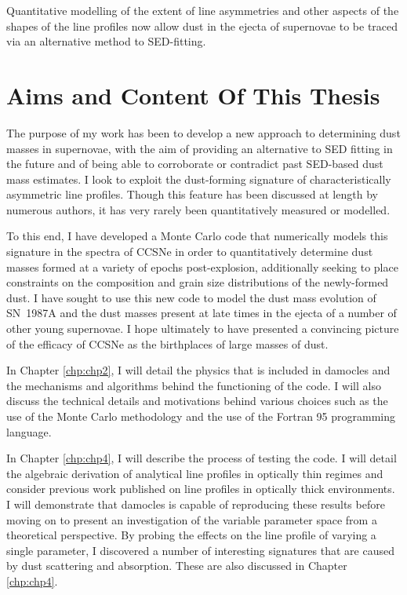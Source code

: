 Quantitative modelling of the extent of line asymmetries and other aspects of the shapes of the line profiles now allow dust in the ejecta of supernovae to be traced via an alternative method to SED-fitting.  

\section{Aims and Content Of This Thesis}
The purpose of my work has been to develop a new approach to determining dust masses in supernovae, with the aim of providing an alternative to SED fitting in the future and of being able to corroborate or contradict past SED-based dust mass estimates.  I look to exploit the dust-forming signature of characteristically asymmetric line profiles.  Though this feature has been discussed at length by numerous authors, it has very rarely been quantitatively measured or modelled.

To this end, I have developed a Monte Carlo  code that numerically models this signature in the spectra of CCSNe in order to quantitatively determine dust masses formed at a variety of epochs post-explosion, additionally seeking to place constraints on the composition and grain size distributions of the newly-formed dust. I have sought to use this new code to model the dust mass evolution  of SN~1987A and the dust masses present at late times in the ejecta of a number of other young supernovae.  I hope ultimately to have presented a convincing picture of the efficacy of CCSNe as the birthplaces of large masses of dust.

In Chapter \ref{chp:chp2}, I will detail the physics that is included in {\sc damocles} and the mechanisms and algorithms behind the functioning of the code.  I will also discuss the technical details and motivations behind various choices such as the use of the Monte Carlo methodology and the use of the Fortran 95 programming language.  

In Chapter \ref{chp:chp4}, I will describe the process of testing the code.  I will detail the algebraic derivation of analytical line profiles in optically thin regimes and consider previous work published on line profiles in optically thick environments.  I will demonstrate that {\sc damocles} is capable of reproducing these results before moving on to present an investigation of the variable parameter space from a theoretical perspective.  By probing the effects on the line profile of varying a single parameter, I discovered a number of interesting signatures that are caused by dust scattering and absorption.  These are also discussed in Chapter \ref{chp:chp4}.  

